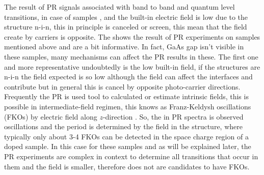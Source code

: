 The result of PR signals associated with band to band and quantum level transitions, in case of samples ,  and  the built-in electric field is low due to the structure n-i-n, this in principle is canceled or screen, this mean that  the field create by carriers is opposite. The  shows the result of PR experiments on samples mentioned above and are a bit informative. In fact, GaAs gap isn't visible in these samples, many mechanisms can affect the PR results in these. The first one and more representative  undoubtedly is the low built-in field, if the structures are n-i-n the field expected is so low although the field can affect the interfaces and contribute but in general this is cancel by opposite photo-carrier directions. Frequently the PR is used tool to calculated or estimate intrinsic fields, this is possible in intermediate-field regimen, this knows as Franz-Keldysh oscillations  (FKOs) by electric field along $z$-direction \cite{shen1995franz}. So, the in PR spectra is observed oscillations and the period is determined by the field in the structure, where typically only about 3-4 FKOs can be detected in the space charge region of a doped sample. In this case for these samples and as will be explained later, the PR experiments are complex in context to determine all transitions  that occur in them and the field is smaller, therefore does not are candidates to have FKOs.


